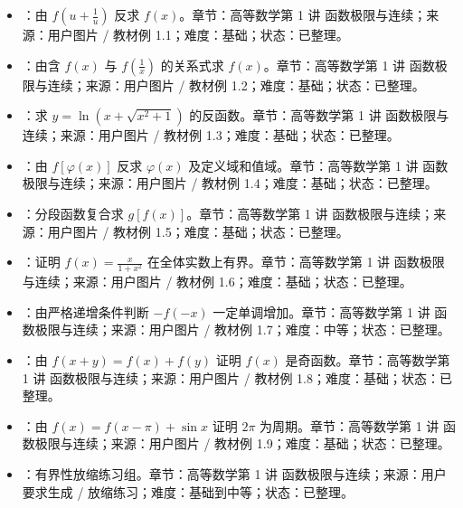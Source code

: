 
\begin{knowledgeBox}
\begin{itemize}
  \item {}\textbf{}：由 \(f\left(u+\frac{1}{u}\right)\) 反求 \(f(x)\)。章节：高等数学第 1 讲 函数极限与连续；来源：用户图片 / 教材例 1.1；难度：基础；状态：已整理。
  \item {}\textbf{}：由含 \(f(x)\) 与 \(f\left(\frac{1}{x}\right)\) 的关系式求 \(f(x)\)。章节：高等数学第 1 讲 函数极限与连续；来源：用户图片 / 教材例 1.2；难度：基础；状态：已整理。
  \item {}\textbf{}：求 \(y=\ln\left(x+\sqrt{x^2+1}\right)\) 的反函数。章节：高等数学第 1 讲 函数极限与连续；来源：用户图片 / 教材例 1.3；难度：基础；状态：已整理。
  \item {}\textbf{}：由 \(f[\varphi(x)]\) 反求 \(\varphi(x)\) 及定义域和值域。章节：高等数学第 1 讲 函数极限与连续；来源：用户图片 / 教材例 1.4；难度：基础；状态：已整理。
  \item {}\textbf{}：分段函数复合求 \(g[f(x)]\)。章节：高等数学第 1 讲 函数极限与连续；来源：用户图片 / 教材例 1.5；难度：基础；状态：已整理。
  \item {}\textbf{}：证明 \(f(x)=\frac{x}{1+x^2}\) 在全体实数上有界。章节：高等数学第 1 讲 函数极限与连续；来源：用户图片 / 教材例 1.6；难度：基础；状态：已整理。
  \item {}\textbf{}：由严格递增条件判断 \(-f(-x)\) 一定单调增加。章节：高等数学第 1 讲 函数极限与连续；来源：用户图片 / 教材例 1.7；难度：中等；状态：已整理。
  \item {}\textbf{}：由 \(f(x+y)=f(x)+f(y)\) 证明 \(f(x)\) 是奇函数。章节：高等数学第 1 讲 函数极限与连续；来源：用户图片 / 教材例 1.8；难度：基础；状态：已整理。
  \item {}\textbf{}：由 \(f(x)=f(x-\pi)+\sin x\) 证明 \(2\pi\) 为周期。章节：高等数学第 1 讲 函数极限与连续；来源：用户图片 / 教材例 1.9；难度：基础；状态：已整理。
  \item {}\textbf{}：有界性放缩练习组。章节：高等数学第 1 讲 函数极限与连续；来源：用户要求生成 / 放缩练习；难度：基础到中等；状态：已整理。

\end{itemize}
\end{knowledgeBox}
